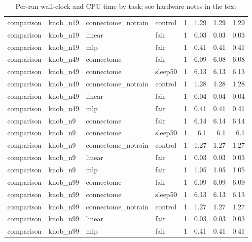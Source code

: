 \begin{table}[t]
\begin{tabular}{llllrrrr}
comparison & knob\_n19 & connectome\_notrain & control & 1 & 1.29 & 1.29 & 1.29 \\
comparison & knob\_n19 & linear & fair & 1 & 0.03 & 0.03 & 0.03 \\
comparison & knob\_n19 & mlp & fair & 1 & 0.41 & 0.41 & 0.41 \\
comparison & knob\_n49 & connectome & fair & 1 & 6.09 & 6.08 & 6.08 \\
comparison & knob\_n49 & connectome & sleep50 & 1 & 6.13 & 6.13 & 6.13 \\
comparison & knob\_n49 & connectome\_notrain & control & 1 & 1.28 & 1.28 & 1.28 \\
comparison & knob\_n49 & linear & fair & 1 & 0.04 & 0.04 & 0.04 \\
comparison & knob\_n49 & mlp & fair & 1 & 0.41 & 0.41 & 0.41 \\
comparison & knob\_n9 & connectome & fair & 1 & 6.14 & 6.14 & 6.14 \\
comparison & knob\_n9 & connectome & sleep50 & 1 & 6.1 & 6.1 & 6.1 \\
comparison & knob\_n9 & connectome\_notrain & control & 1 & 1.27 & 1.27 & 1.27 \\
comparison & knob\_n9 & linear & fair & 1 & 0.03 & 0.03 & 0.03 \\
comparison & knob\_n9 & mlp & fair & 1 & 1.05 & 1.05 & 1.05 \\
comparison & knob\_n99 & connectome & fair & 1 & 6.09 & 6.09 & 6.09 \\
comparison & knob\_n99 & connectome & sleep50 & 1 & 6.13 & 6.13 & 6.13 \\
comparison & knob\_n99 & connectome\_notrain & control & 1 & 1.27 & 1.27 & 1.27 \\
comparison & knob\_n99 & linear & fair & 1 & 0.03 & 0.03 & 0.03 \\
comparison & knob\_n99 & mlp & fair & 1 & 0.41 & 0.41 & 0.41 \\
\bottomrule
\end{tabular}
\caption{Per-run wall-clock and CPU time by task; see hardware notes in the text}
\label{tab:compute_cost_by_task}
\end{table}